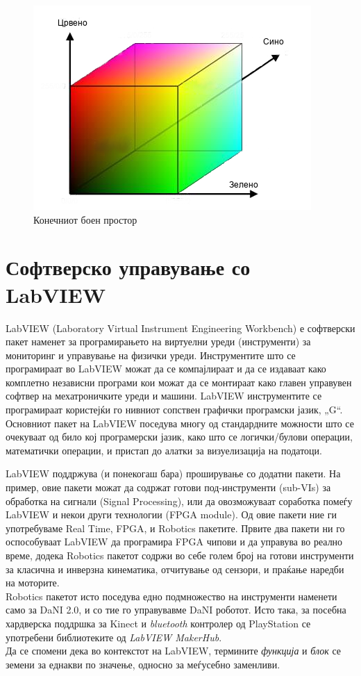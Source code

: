 \documentclass[12pt]{article}
\begin{document}
    \begin{figure}[h]
      \label{fig:colour_cube_mk.png}
      \centering
      \includegraphics[width = 0.6\linewidth]{./images/colour_cube_mk.png}
      \caption{Конечниот боен простор}
      \end{figure}

\newpage

\section{Софтверско управување со LabVIEW}
  LabVIEW (Laboratory Virtual Instrument Engineering Workbench) е софтверски пакет наменет за програмирањето на виртуелни уреди (инструменти) за мониторинг и управување на физички уреди. Инструментите што се програмираат во LabVIEW можат да се компајлираат и да се издаваат како комплетно независни програми кои можат да се монтираат како главен управувен софтвер на мехатроничките уреди и машини. LabVIEW инструментите се програмираат користејќи го нивниот сопствен графички програмски јазик, „G“.
  \\
  Основниот пакет на LabVIEW поседува многу од стандардните можности што се очекуваат од било кој програмерски јазик, како што се логички/булови операции, математички операции, и пристап до алатки за визуелизација на податоци.

  LabVIEW поддржува (и понекогаш бара) проширување со додатни пакети. На пример, овие пакети можат да содржат готови под-инструменти (sub-VIs) за обработка на сигнали (Signal Processing), или да овозможуваат соработка помеѓу LabVIEW и некои други технологии (FPGA module). Од овие пакети ние ги употребуваме Real Time, FPGA, и Robotics пакетите. Првите два пакети ни го оспособуваат LabVIEW да програмира FPGA чипови и да управува во реално време, додека Robotics пакетот содржи во себе голем број на готови инструменти за класична и инверзна кинематика, отчитување од сензори, и праќање наредби на моторите.
  \\
  Robotics пакетот исто поседува едно подмножество на инструменти наменети само за DaNI 2.0, и со тие го управувавме DaNI роботот. Исто така, за посебна хардверска поддршка за Kinect и \textit{bluetooth} контролер од PlayStation се употребени библиотеките од \textit{LabVIEW MakerHub}.
  \\
  Да се спомени дека во контекстот на LabVIEW, термините \textit{функција} и \textit{блок} се земени за еднакви по значење, односно за меѓусебно заменливи.
\end{document}
